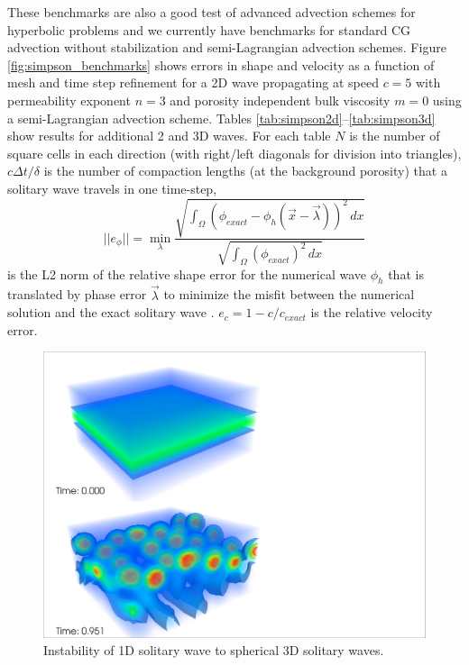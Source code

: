 These benchmarks are also a good test of advanced advection schemes
for hyperbolic problems and we currently have benchmarks for standard
CG advection without stabilization and semi-Lagrangian advection
schemes.  Figure \ref{fig:simpson_benchmarks} shows errors in shape
and velocity as a function of
mesh and time step refinement for a 2D wave
propagating at speed $c=5$ with permeability exponent $n=3$ and
porosity independent bulk viscosity $m=0$ using a semi-Lagrangian
advection scheme.  Tables \ref{tab:simpson2d}--\ref{tab:simpson3d}
show results for additional 2 and 3D waves. For each table $N$ is the number of square cells in each direction (with right/left diagonals for division into triangles), $c\Delta t/\delta$ is the number of compaction lengths (at the background porosity) that  a solitary wave travels in one time-step,
\begin{displaymath}
  ||e_{\phi}||=\min_\lambda\frac{\sqrt{\int_\Omega(\phi_{exact} - \phi_{h}(\vec{x} - \vec\lambda))^{2}\,dx}}{\sqrt{\int_\Omega(\phi_{exact})^{2}\,dx}}
\end{displaymath}
is the L2 norm of the relative shape error for the numerical wave $\phi_h$ that is translated by phase error $\vec{\lambda}$ to minimize the misfit between the numerical solution and the exact solitary wave \citep[see][for details of error analysis]{simpson_solitary_2011}.  $e_{c} =  1 - c/c_{exact}$ is the relative velocity error.

\begin{figure}[htb]
  \centering
  \includegraphics[width=.5\textwidth,clip=true]{figures/1dto3dwaves}
  \caption{Instability of 1D solitary wave to spherical 3D solitary waves.}
  \label{fig:1dto3dwaves}
\end{figure}

